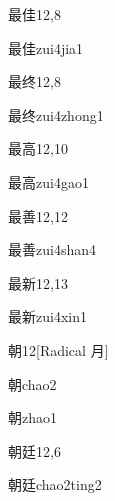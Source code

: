 \begin{entry}{最佳}{12,8}
  \begin{phonetics}{最佳}{zui4jia1}
  \end{phonetics}
\end{entry}

\begin{entry}{最终}{12,8}
  \begin{phonetics}{最终}{zui4zhong1}
  \end{phonetics}
\end{entry}

\begin{entry}{最高}{12,10}
  \begin{phonetics}{最高}{zui4gao1}
  \end{phonetics}
\end{entry}

\begin{entry}{最善}{12,12}
  \begin{phonetics}{最善}{zui4shan4}
  \end{phonetics}
\end{entry}

\begin{entry}{最新}{12,13}
  \begin{phonetics}{最新}{zui4xin1}
  \end{phonetics}
\end{entry}

\begin{entry}{朝}{12}[Radical 月]
  \begin{phonetics}{朝}{chao2}
  \end{phonetics}
  \begin{phonetics}{朝}{zhao1}
  \end{phonetics}
\end{entry}

\begin{entry}{朝廷}{12,6}
  \begin{phonetics}{朝廷}{chao2ting2}
  \end{phonetics}
\end{entry}

